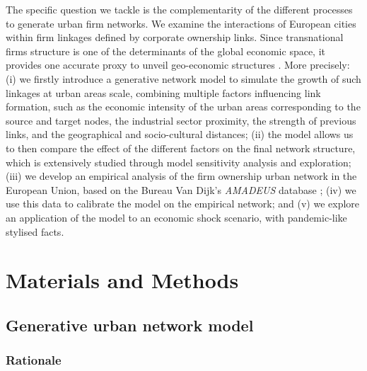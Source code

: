 \documentclass[10pt,letterpaper]{article}
\begin{document}
The specific question we tackle is the complementarity of the different processes to generate urban firm networks. We examine the interactions of European cities within firm linkages defined by corporate ownership links. Since transnational firms structure is one of the determinants of the global economic space, it provides one accurate proxy to unveil geo-economic structures \cite{2020Zdanowska}. More precisely: (i) we firstly introduce a generative network model to simulate the growth of such linkages at urban areas scale, combining multiple factors influencing link formation, such as the economic intensity of the urban areas corresponding to the source and target nodes, the industrial sector proximity, the strength of previous links, and the geographical and socio-cultural distances; (ii) the model allows us to then compare the effect of the different factors on the final network structure, which is extensively studied through model sensitivity analysis and exploration; (iii) we develop an empirical analysis of the firm ownership urban network in the European Union, based on the Bureau Van Dijk's \emph {AMADEUS} database \cite{AMADEUS2018};  (iv) we use this data to calibrate the model on the empirical network; and (v) we explore an application of the model to an economic shock scenario, with pandemic-like stylised facts. 



\section*{Materials and Methods}

\subsection*{Generative urban network model}

\subsubsection*{Rationale}
\end{document}

